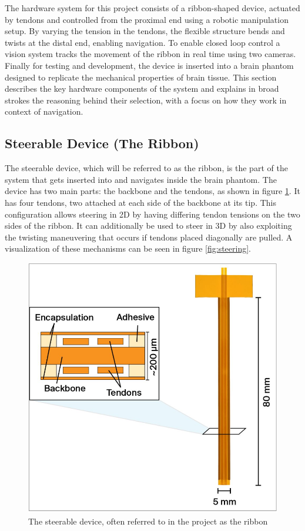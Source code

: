 The hardware system for this project consists of a ribbon-shaped device, actuated by tendons and controlled from the proximal end using a robotic manipulation setup. By varying the tension in the tendons, the flexible structure bends and twists at the distal end, enabling navigation. To enable closed loop control a vision system tracks the movement of the ribbon in real time using two cameras. Finally for testing and development, the device is inserted into a brain phantom designed to replicate the mechanical properties of brain tissue. This section describes the key hardware components of the system and explains in broad strokes the reasoning behind their selection, with a focus on how they work in context of navigation.


\subsection{Steerable Device (The Ribbon)}
The steerable device, which will be referred to as the ribbon, is the part of the system that gets inserted into and navigates inside the brain phantom. The device has two main parts: the backbone and the tendons, as shown in figure \ref{fig:ribbon}. It has four tendons, two attached at each side of the backbone at its tip. This configuration allows steering in 2D by having differing tendon tensions on the two sides of the ribbon. It can additionally be used to steer in 3D by also exploiting the twisting maneuvering that occurs if tendons placed diagonally are pulled. A visualization of these mechanisms can be seen in figure \ref{fig:steering}.
\begin{figure} [H]
    \centering
    \includegraphics[width=0.55\linewidth]{images/Hardware/ribbon.PNG}
    \caption{The steerable device, often referred to in the project as the ribbon}
    \label{fig:ribbon}
\end{figure}
